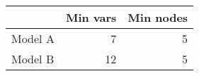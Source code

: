 
\begin{tabular}{l|r|r}
\hline
  & Min vars & Min nodes\\
\hline
Model A & 7 & 5\\
\hline
Model B & 12 & 5\\
\hline
\end{tabular}